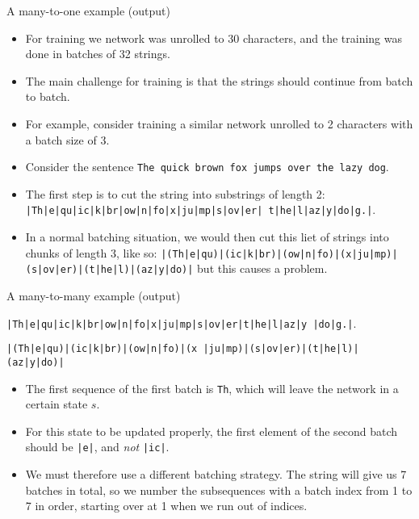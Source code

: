 \documentclass[10pt]{beamer}
\begin{document}
\begin{frame}{A many-to-one example (output)}
\begin{itemize}
  \item For training we network was unrolled to 30 characters, and the training was done in batches of 32 strings.
  \item The main challenge for training is that the strings should continue from batch to batch.  \item For example, consider training a similar network unrolled to 2 characters with a batch size of 3.
  \item Consider the sentence {\tt The quick brown fox jumps over the lazy dog}.
  \item The first step is to cut the string into substrings of length 2:
  {\tt |Th|e\textvisiblespace |qu|ic|k\textvisiblespace |br|ow|n\textvisiblespace |fo|x\textvisiblespace |ju|mp|s\textvisiblespace |ov|er| \textvisiblespace t|he|\textvisiblespace l|az|y\textvisiblespace |do|g.|}.
  \item In a normal batching situation, we would then cut this liet of strings into chunks of length 3, like so:
{\tt |(Th|e\textvisiblespace |qu)|(ic|k\textvisiblespace |br)|(ow|n\textvisiblespace |fo)|(x\textvisiblespace |ju|mp)| (s\textvisiblespace |ov|er)|(\textvisiblespace t|he|\textvisiblespace l)|(az|y\textvisiblespace |do)|} but this causes a problem.
\end{itemize}
\end{frame}

\begin{frame}{A many-to-many example (output)}

    {\tt |Th|e\textvisiblespace |qu|ic|k\textvisiblespace |br|ow|n\textvisiblespace |fo|x\textvisiblespace |ju|mp|s\textvisiblespace |ov|er|\textvisiblespace t|he|\textvisiblespace l|az|y |do|g.|}.

    {\tt |(Th|e\textvisiblespace |qu)|(ic|k\textvisiblespace |br)|(ow|n\textvisiblespace |fo)|(x |ju|mp)|(s\textvisiblespace |ov|er)|(\textvisiblespace t|he|\textvisiblespace l)|(az|y\textvisiblespace |do)|}

  \begin{itemize}
\item The first sequence of the first batch is {\tt Th}, which will leave the network in a certain state $s$. \item For this state to be updated properly, the first element of the second batch should be {\tt |e\textvisiblespace |}, and {\em not} {\tt |ic|}.
\item We must therefore use a different batching strategy. The string will give us 7 batches in total, so we number the subsequences with a batch index from 1 to 7 in order, starting over at 1 when we run out of indices.
\end{itemize}
\end{frame}
\end{document}
